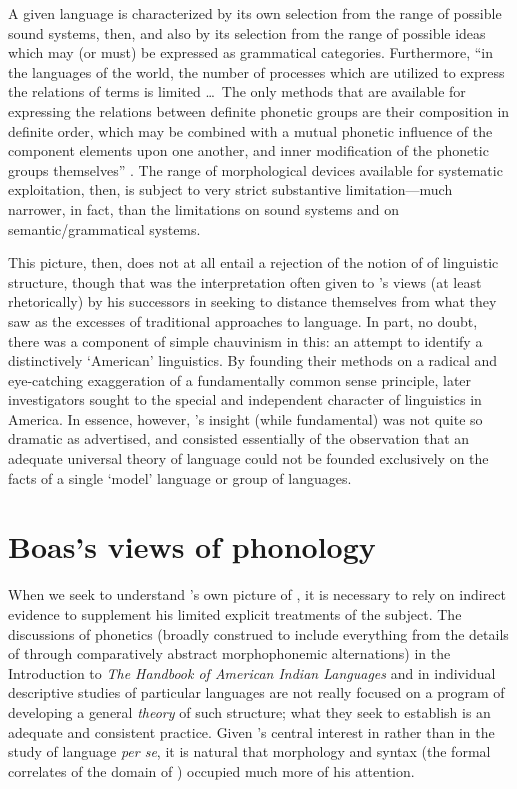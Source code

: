 A given language is characterized by its own selection from the range
of possible sound systems, then, and also by its selection from the
range of possible ideas which may (or must) be expressed as
grammatical categories. Furthermore, ``in the languages of the world,
the number of processes which are utilized to express the relations of
terms is limited \ldots\ The only methods that are available for
expressing the relations between definite phonetic groups are their
composition in definite order, which may be combined with a mutual
phonetic influence of the component elements upon one another, and
inner modification of the phonetic groups themselves''
\citep[27]{boas11:introduction}. The range of morphological devices
available for systematic exploitation, then, is subject to very strict
substantive limitation—much narrower, in fact, than the limitations on
sound systems and on semantic/grammatical systems.

This picture, then, does not at all entail a rejection of the notion
of  of linguistic structure, though that was the
interpretation often given to {\Boas}'s views (at least rhetorically) by
his successors in seeking to distance themselves from what they saw as
the excesses of traditional approaches to language. In part, no doubt,
there was a component of simple chauvinism in this: an attempt to
identify a distinctively `American' linguistics. By founding their
methods on a radical and eye-catching exaggeration of a fundamentally
common sense principle, later investigators sought to  the
special and independent character of linguistics in America. In
essence, however, {\Boas}'s insight (while fundamental) was not quite so
dramatic as advertised, and consisted essentially of the observation
that an adequate universal theory of language could not be founded
exclusively on the facts of a single `model' language or group of
languages.

\section{Boas's views of phonology}

When we seek to understand {\Boas}'s own picture of , it
is necessary to rely on indirect evidence to supplement his limited
explicit treatments of the subject. The discussions of phonetics
(broadly construed to include everything from the details of
 through comparatively abstract morphophonemic
alternations) in the Introduction to \textsl{The Handbook of American
  Indian Languages} and in individual descriptive studies of
particular languages are not really focused on a program of developing
a general \emph{theory} of such structure; what they seek to establish
is an adequate and consistent practice. Given {\Boas}'s central interest
in  rather than in the study of language \emph{per se}, it
is natural that morphology and syntax (the formal correlates of the
domain of ) occupied much more of his attention.

